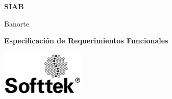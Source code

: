 \begin{titlepage}
    \begin{center}
        \vspace*{1cm}
        
        \Huge
        \textbf{SIAB}
        
        \vspace{0.5cm}
        \LARGE
        Banorte
        
        \vspace{3cm}
        
        \textbf{Especificación de Requerimientos Funcionales}
        
        \vfill
        
        
        \vspace{0.8cm}
        
        \includegraphics[width=0.3\textwidth]{img/Softtek_1ink_SMALL.jpg}
        
        \Large
        
    \end{center}
\end{titlepage}